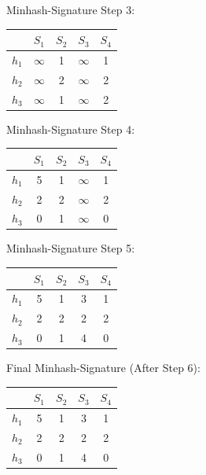 \documentclass[]{scrartcl}
\begin{document}
\vspace{1cm}

Minhash-Signature Step 3:\\
\begin{tabular}{c||c|c|c|c}
	& $S_1$ & $S_2$ & $S_3$ &$S_4$  \\ 
	\hline \hline
	$h_1$	&  $\infty$ & 1 & $\infty$ & 1 \\ 
	\hline 
	$h_2$	&  $\infty$ & 2 & $\infty$ & 2 \\ 
	\hline 
	$h_3$	&  $\infty$ & 1 & $\infty$ & 2 \\ 
\end{tabular} 

\vspace{1cm}

Minhash-Signature Step 4:\\
\begin{tabular}{c||c|c|c|c}
			& $S_1$ & $S_2$ & $S_3$ &$S_4$  \\ 
	\hline \hline
	$h_1$	&  5 & 1 & $\infty$ & 1 \\ 
	\hline 
	$h_2$	&  2 & 2 & $\infty$ & 2 \\ 
	\hline 
	$h_3$	&  0 & 1 & $\infty$ & 0 \\ 
\end{tabular} 

\vspace{1cm}

Minhash-Signature Step 5:\\
\begin{tabular}{c||c|c|c|c}
	& $S_1$ & $S_2$ & $S_3$ &$S_4$  \\ 
	\hline \hline
	$h_1$	&  5 & 1 & 3 & 1 \\ 
	\hline 
	$h_2$	&  2 & 2 & 2 & 2 \\ 
	\hline 
	$h_3$	&  0 & 1 & 4 & 0 \\ 
\end{tabular} 

\vspace{1cm}

Final Minhash-Signature (After Step 6):\\
\begin{tabular}{c||c|c|c|c}
	& $S_1$ & $S_2$ & $S_3$ &$S_4$  \\ 
	\hline \hline
	$h_1$	&  5 & 1 & 3 & 1 \\ 
	\hline 
	$h_2$	&  2 & 2 & 2 & 2 \\ 
	\hline 
	$h_3$	&  0 & 1 & 4 & 0 \\ 
\end{tabular} 
\end{document}
